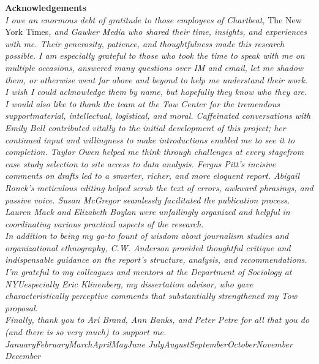 \documentclass[symmetric, notoc, nobib]{towcenter-book}
\newcommand{\monthyear}{%
  \ifcase\month\or January\or February\or March\or April\or May\or June\or
  July\or August\or September\or October\or November\or
  December\fi\space\number\year
}
\begin{document}
\textsf{\textbf{Acknowledgements}} 
\\[1.0cm]
\noindent\textit{I owe an enormous debt of gratitude to those employees of Chartbeat,} The New York Times\textit{, and 
Gawker Media who shared their time, insights, and experiences with me. Their generosity, 
patience, and thoughtfulness made this research possible. I am especially grateful to those who 
took the time to speak with me on multiple occasions, answered many questions over IM and 
email, let me shadow them, or otherwise went far above and beyond to help me understand their 
work. I wish I could acknowledge them by name, but hopefully they know who they are.
}\\[0.5cm]
\noindent\textit{I would also like to thank the team at the Tow Center for the tremendous support\textemdash material, 
intellectual, logistical, and moral. Caffeinated conversations with Emily Bell contributed vitally 
to the initial development of this project; her continued input and willingness to make 
introductions enabled me to see it to completion. Taylor Owen helped me think through 
challenges at every stage\textemdash from case study selection to site access to data analysis. Fergus Pitt's 
incisive comments on drafts led to a smarter, richer, and more eloquent report. Abigail Ronck's 
meticulous editing helped scrub the text of errors, awkward phrasings, and passive voice. Susan 
McGregor seamlessly facilitated the publication process. Lauren Mack and Elizabeth Boylan 
were unfailingly organized and helpful in coordinating various practical aspects of the research. }\\[0.5cm]
\noindent\textit{In addition to being my go-to fount of wisdom about journalism studies and organizational 
ethnography, C.W. Anderson provided thoughtful critique and indispensable guidance on the 
report's structure, analysis, and recommendations. }\\[0.5cm]
\noindent\textit{I'm grateful to my colleagues and mentors at the Department of Sociology at NYU\textemdash especially 
Eric Klinenberg, my dissertation advisor, who gave characteristically perceptive comments that 
substantially strengthened my Tow proposal.}\\[0.5cm]
\noindent\textit{
Finally, thank you to Ari Brand, Ann Banks, and Peter Petre for all that you do (and there is so 
very much) to support me. 
}\\[0.5cm]


\noindent\textit{\monthyear}

\tableofcontents
\end{document}
